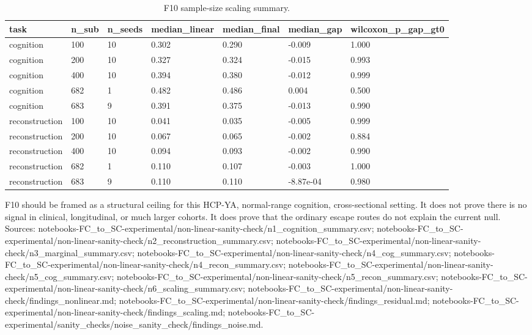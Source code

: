 \documentclass{article}
\begin{document}
\begin{table}[H]
\centering
\scriptsize
\caption{F10 sample-size scaling summary.}
\label{tab:f10n6}
\begin{tabular}{lllllll}
\toprule
task & n\_sub & n\_seeds & median\_linear & median\_final & median\_gap & wilcoxon\_p\_gap\_gt0 \\
\midrule
cognition & 100 & 10 & 0.302 & 0.290 & -0.009 & 1.000 \\
cognition & 200 & 10 & 0.327 & 0.324 & -0.015 & 0.993 \\
cognition & 400 & 10 & 0.394 & 0.380 & -0.012 & 0.999 \\
cognition & 682 & 1 & 0.482 & 0.486 & 0.004 & 0.500 \\
cognition & 683 & 9 & 0.391 & 0.375 & -0.013 & 0.990 \\
reconstruction & 100 & 10 & 0.041 & 0.035 & -0.005 & 0.999 \\
reconstruction & 200 & 10 & 0.067 & 0.065 & -0.002 & 0.884 \\
reconstruction & 400 & 10 & 0.094 & 0.093 & -0.002 & 0.990 \\
reconstruction & 682 & 1 & 0.110 & 0.107 & -0.003 & 1.000 \\
reconstruction & 683 & 9 & 0.110 & 0.110 & -8.87e-04 & 0.980 \\
\bottomrule
\end{tabular}
\end{table}

F10 should be framed as a structural ceiling for this HCP-YA, normal-range cognition,
cross-sectional setting. It does not prove there is no signal in clinical, longitudinal,
or much larger cohorts. It does prove that the ordinary escape routes do not explain the
current null.  Sources: notebooks-FC\_to\_SC-experimental/non-linear-sanity-check/n1\_cognition\_summary.csv; notebooks-FC\_to\_SC-experimental/non-linear-sanity-check/n2\_reconstruction\_summary.csv; notebooks-FC\_to\_SC-experimental/non-linear-sanity-check/n3\_marginal\_summary.csv; notebooks-FC\_to\_SC-experimental/non-linear-sanity-check/n4\_cog\_summary.csv; notebooks-FC\_to\_SC-experimental/non-linear-sanity-check/n4\_recon\_summary.csv; notebooks-FC\_to\_SC-experimental/non-linear-sanity-check/n5\_cog\_summary.csv; notebooks-FC\_to\_SC-experimental/non-linear-sanity-check/n5\_recon\_summary.csv; notebooks-FC\_to\_SC-experimental/non-linear-sanity-check/n6\_scaling\_summary.csv; notebooks-FC\_to\_SC-experimental/non-linear-sanity-check/findings\_nonlinear.md; notebooks-FC\_to\_SC-experimental/non-linear-sanity-check/findings\_residual.md; notebooks-FC\_to\_SC-experimental/non-linear-sanity-check/findings\_scaling.md; notebooks-FC\_to\_SC-experimental/sanity\_checks/noise\_sanity\_check/findings\_noise.md.
\end{document}
